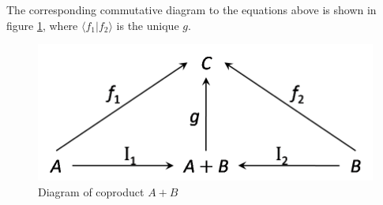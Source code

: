 The corresponding commutative diagram to the equations above is shown in figure \ref{figure:cat_cop}, where $ \langle f_1 | f_2 \rangle $ is the unique $ g $.
\begin{figure}[h!]
\centering
\includegraphics[scale=0.48]{./images/cat_cop}
\caption{Diagram of coproduct $ A+B $}
\label{figure:cat_cop}
\end{figure}

